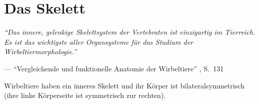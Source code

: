 \section{Das Skelett}

\vspace{0.5cm}
\begin{center}
 \begin{minipage}{12cm}
  \emph{"`Das innere, gelenkige Skelettsystem der Vertebraten ist einzigartig im Tierreich. Es ist das wichtigste aller Organsysteme für das Studium der Wirbeltiermorphologie."'}
 
  --- "`Vergleichende und funktionelle Anatomie der Wirbeltiere"' \cite{Vergleichende_Anatomie}, S.\ 131
 \end{minipage}
\end{center}

Wirbeltiere haben ein inneres Skelett und ihr Körper ist bilateralsymmetrisch (ihre linke Körperseite ist symmetrisch zur rechten).




